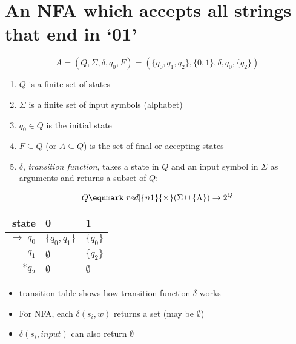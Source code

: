 \section*{An NFA which accepts all strings that end in `01'}
\begin{minipage}{\linewidth}
  \centering
\end{minipage}
\[
  A = (Q,\Sigma,\delta,q_{0},F) = (\{q_{0},q_{1},q_{2}\},\{0,1\},\delta,q_{0},\{q_{2}\})
\]
\begin{enumerate}
\item $Q$ is a finite set of states
\item $\Sigma$ is a finite set of input symbols (alphabet)
\item $q_{0} \in Q$ is the initial state
\item $F \subseteq Q$ (or $A \subseteq Q$) is the set of final or accepting states
\item $\delta$, \emph{transition function}, takes a state in $Q$ and an input symbol in $\Sigma$ as arguments and returns a subset of $Q$:
\end{enumerate}
\begin{equation*}
  Q \eqnmark[red]{n1}{\times} (\Sigma \cup \{\Lambda\}) \to 2^{Q}
\end{equation*}

\begin{minipage}{.5\linewidth}
  \centering
  \begin{tabular}{r||l|l}
    state & 0 & 1 \\
    \hline
    \hline
    $\to\; q_{0}$    & $\{q_{0}, q_{1}\}$ & $\{q_{0}\}$\\
    $q_{1}$          & $\emptyset$      & $\{q_{2}\}$\\
    $*q_{2}$         & $\emptyset$      & $\emptyset$
  \end{tabular}
\end{minipage}
\begin{minipage}{.5\linewidth}
  \flushleft
  \begin{itemize}
  \item transition table shows how transition function $\delta$ works
  \item For NFA, each $\delta(s_{i}, w)$ returns a set (may be $\emptyset$)
  \item $\delta(s_{i}, input)$ can also return $\emptyset$
  \end{itemize}
\end{minipage}

